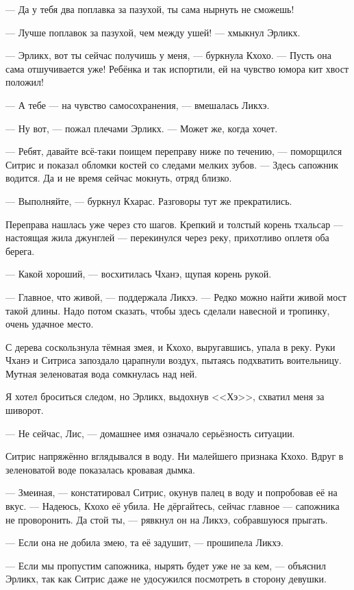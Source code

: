 --- Да у тебя два поплавка за пазухой, ты сама нырнуть не сможешь!

--- Лучше поплавок за пазухой, чем между ушей! --- хмыкнул Эрликх.

--- Эрликх, вот ты сейчас получишь у меня, --- буркнула Кхохо.
--- Пусть она сама отшучивается уже!
Ребёнка и так испортили, ей на чувство юмора кит хвост положил!

--- А тебе --- на чувство самосохранения, --- вмешалась Ликхэ.

--- Ну вот, --- пожал плечами Эрликх.
--- Может же, когда хочет.

--- Ребят, давайте всё-таки поищем переправу ниже по течению, --- поморщился Ситрис и показал обломки костей со следами мелких зубов.
--- Здесь сапожник водится.
Да и не время сейчас мокнуть, отряд близко.

--- Выполняйте, --- буркнул Кхарас.
Разговоры тут же прекратились.

\asterism

Переправа нашлась уже через сто шагов.
Крепкий и толстый корень тхальсар --- настоящая жила джунглей --- перекинулся через реку, прихотливо оплетя оба берега.

--- Какой хороший, --- восхитилась Чханэ, щупая корень рукой.

--- Главное, что живой, --- поддержала Ликхэ.
--- Редко можно найти живой мост такой длины.
Надо потом сказать, чтобы здесь сделали навесной и тропинку, очень удачное место.

С дерева соскользнула тёмная змея, и Кхохо, выругавшись, упала в реку.
Руки Чханэ и Ситриса запоздало царапнули воздух, пытаясь подхватить воительницу.
Мутная зеленоватая вода сомкнулась над ней.

Я хотел броситься следом, но Эрликх, выдохнув <<Хэ>>, схватил меня за шиворот.

--- Не сейчас, Лис, --- домашнее имя означало серьёзность ситуации.

Ситрис напряжённо вглядывался в воду.
Ни малейшего признака Кхохо.
Вдруг в зеленоватой воде показалась кровавая дымка.

--- Змеиная, --- констатировал Ситрис, окунув палец в воду и попробовав её на вкус.
--- Надеюсь, Кхохо её убила.
Не дёргайтесь, сейчас главное --- сапожника не проворонить.
Да стой ты, --- рявкнул он на Ликхэ, собравшуюся прыгать.

--- Если она не добила змею, та её задушит, --- прошипела Ликхэ.

--- Если мы пропустим сапожника, нырять будет уже не за кем, --- объяснил Эрликх, так как Ситрис даже не удосужился посмотреть в сторону девушки.

